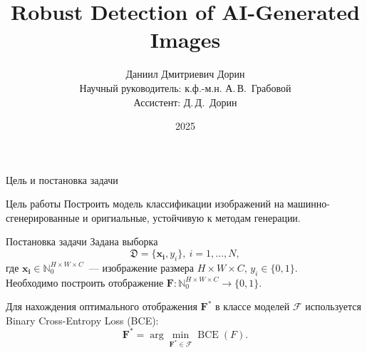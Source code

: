 \documentclass[aspectratio=169]{beamer}
\title[\hbox to 56mm{Краткое название}]{Robust Detection of AI-Generated Images}
\author[Д.\,Д.~Дорин]{Даниил Дмитриевич Дорин\\
\small Научный руководитель: к.ф.-м.н. А.\,В.~Грабовой \\
\small Ассистент: Д.\,Д.~Дорин}
\institute{Анализ данных ФПМИ МФТИ}
\date{2025}
\begin{document}
\begin{frame}
\thispagestyle{empty}
\maketitle
\end{frame}

\begin{frame}{Цель и постановка задачи}
\begin{block}{Цель работы}
    Построить модель классификации изображений на машинно-сгенерированные и оригиальные, устойчивую к методам генерации. 
\end{block}
\begin{block}{Постановка задачи}
Задана выборка $$\mathfrak{D} = \{\bm{x_i}, y_i \},\ i= 1, ..., N,$$ где $\bm{x_i} \in \mathbb{N}_0^{H \times W \times C}$~--- изображение размера $H \times W \times C$, $y_i \in \{ 0, 1\}.$ \\

Необходимо построить отображение $\bm{F}: \mathbb{N}_0^{H \times W \times C} \rightarrow \{ 0, 1 \}.$

Для нахождения оптимального отображения \( \bm{F}^* \) в классе моделей \( \mathcal{F} \) используется Binary Cross-Entropy Loss (BCE):
\[
	\bm{F}^* = \arg\min_{\bm{F}^* \in \mathcal{F}} \operatorname{BCE}(F).
\]
\end{block}
\end{frame}
\end{document}
